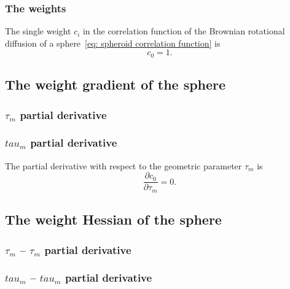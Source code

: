 \subsubsection{The weights}

The single weight $c_i$ in the correlation function of the Brownian rotational diffusion of a sphere~\eqref{eq: spheroid correlation function} is
\begin{equation}
    c_{0} = 1.
\end{equation}




\subsection{The weight gradient of the sphere}


\begin{latexonly}
    \subsubsection{$\tau_m$ partial derivative}
\end{latexonly}
\begin{htmlonly}
    \subsubsection{$tau_m$ partial derivative}
\end{htmlonly}

The partial derivative with respect to the geometric parameter $\tau_m$ is
\begin{equation}
    \frac{\partial c_{0}}{\partial \tau_m} = 0.
\end{equation}




\subsection{The weight Hessian of the sphere}


\begin{latexonly}
    \subsubsection{$\tau_m$ -- $\tau_m$ partial derivative}
\end{latexonly}
\begin{htmlonly}
    \subsubsection{$tau_m$ -- $tau_m$ partial derivative}
\end{htmlonly}


